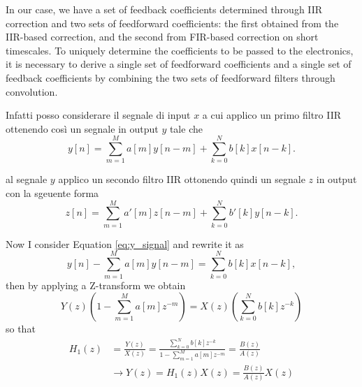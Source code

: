 In our case, we have a set of feedback coefficients determined through IIR correction and two sets of feedforward coefficients: the first obtained from the IIR-based correction, and the second from FIR-based correction on short timescales. 
To uniquely determine the coefficients to be passed to the electronics, it is necessary to derive a single set of feedforward coefficients and a single set of feedback coefficients by combining the two sets of feedforward filters through convolution.

Infatti posso considerare il segnale di input $x$ a cui applico un primo filtro IIR ottenendo così un segnale in output $y$ tale che
\begin{equation}\label{eq:y_signal}
    y[n] = \sum_{m=1}^{M} a[m]y[n-m] + \sum_{k=0}^{N} b[k] x[n-k].
\end{equation}

al segnale $y$ applico un secondo filtro IIR ottonendo quindi un segnale $z$ in output con la sgeuente forma 
\begin{equation}\label{eq:z_signal}
    z[n] = \sum_{m=1}^{M} a'[m]z[n-m] + \sum_{k=0}^{N} b'[k] y[n-k].
\end{equation}

Now I consider Equation \ref{eq:y_signal} and rewrite it as
\begin{equation}\label{eq:y_signal1}
    y[n] - \sum_{m=1}^{M} a[m]y[n-m] = \sum_{k=0}^{N} b[k] x[n-k],
\end{equation} 
then by applying a Z-transform we obtain
\begin{equation}\label{eq:y_signal_transform}
    Y(z)\left(1 - \sum_{m=1}^{M} a[m] z^{-m} \right) = X(z) \left( \sum_{k=0}^{N} b[k] z^{-k} \right)
\end{equation}
so that 
\begin{align}
    H_1(z) &= \frac{Y(z)}{X(z)} = \frac{\sum_{k=0}^{N} b[k] z^{-k}}{1 - \sum_{m=1}^{M} a[m] z^{-m}} = \frac{B(z)}{A(z)} \\
    & \rightarrow Y(z) = H_1(z)X(z) = \frac{B(z)}{A(z)}X(z) \\ \label{eq:transfer1}
\end{align}

